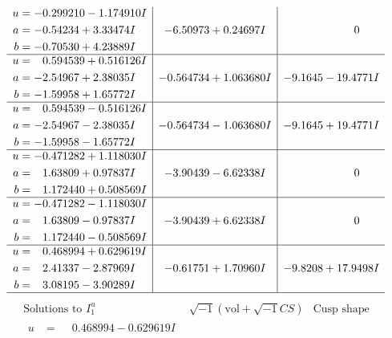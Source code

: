 \documentclass[1p]{elsarticle_modified}
\theoremstyle{definition}
\newcommand{\I}{\sqrt{-1}}
\begin{document}
$$\begin{array}{c|c|c}
\begin{aligned}
u &= -0.299210 - 1.174910 I \\
a &= -0.54234 + 3.33474 I \\
b &= -0.70530 + 4.23889 I\end{aligned}
 & -6.50973 + 0.24697 I & \phantom{-0.000000 } 0 \\ \hline\begin{aligned}
u &= \phantom{-}0.594539 + 0.516126 I \\
a &= -2.54967 + 2.38035 I \\
b &= -1.59958 + 1.65772 I\end{aligned}
 & -0.564734 + 1.063680 I & -9.1645 - 19.4771 I \\ \hline\begin{aligned}
u &= \phantom{-}0.594539 - 0.516126 I \\
a &= -2.54967 - 2.38035 I \\
b &= -1.59958 - 1.65772 I\end{aligned}
 & -0.564734 - 1.063680 I & -9.1645 + 19.4771 I \\ \hline\begin{aligned}
u &= -0.471282 + 1.118030 I \\
a &= \phantom{-}1.63809 + 0.97837 I \\
b &= \phantom{-}1.172440 + 0.508569 I\end{aligned}
 & -3.90439 - 6.62338 I & \phantom{-0.000000 } 0 \\ \hline\begin{aligned}
u &= -0.471282 - 1.118030 I \\
a &= \phantom{-}1.63809 - 0.97837 I \\
b &= \phantom{-}1.172440 - 0.508569 I\end{aligned}
 & -3.90439 + 6.62338 I & \phantom{-0.000000 } 0 \\ \hline\begin{aligned}
u &= \phantom{-}0.468994 + 0.629619 I \\
a &= \phantom{-}2.41337 - 2.87969 I \\
b &= \phantom{-}3.08195 - 3.90289 I\end{aligned}
 & -0.61751 + 1.70960 I & -9.8208 + 17.9498 I\\
 \hline 
 \end{array}$$\newpage$$\begin{array}{c|c|c}  
\text{Solutions to }I^u_{1}& \I (\text{vol} + \sqrt{-1}CS) & \text{Cusp shape}\\
 \hline 
\begin{aligned}
u &= \phantom{-}0.468994 - 0.629619 I \\

\end{aligned}
\end{array}$$
\end{document}
